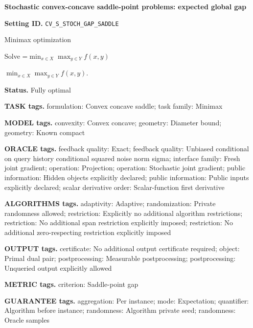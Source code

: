\documentclass[10pt,a4paper]{article}
\newcommand{\AtlasMath}[1]{\par\begingroup\centering\setbox0=\hbox{$\displaystyle #1$}\ifdim\wd0>1.4\linewidth\typeout{ATLAS WIDE FORMULA: \the\wd0}\fi\ifdim\wd0>\linewidth\resizebox{\linewidth}{!}{\box0}\else\box0\fi\par\endgroup}
\newcommand{\AtlasInlineMath}[1]{\begingroup\setbox0=\hbox{$#1$}\ifdim\wd0>.4\linewidth\endgroup\AtlasMath{#1}\else\endgroup$#1$\fi}
\begin{document}
\raggedright

{\LARGE\bfseries\sffamily\color{AtlasNavy} Stochastic convex-concave saddle-point problems: expected global gap\par}\vspace{5pt}


\textbf{Setting ID.} \texttt{CV\_\allowbreak{}S\_\allowbreak{}STOCH\_\allowbreak{}GAP\_\allowbreak{}SADDLE}



Minimax optimization



Solve \AtlasInlineMath{\min_{x\in X}\max_{y\in Y}f(x,y)}.



\textbf{Status.} Fully optimal



\textbf{TASK tags.} formulation: Convex concave saddle; task family: Minimax



\textbf{MODEL tags.} convexity: Convex concave; geometry: Diameter bound; geometry: Known compact



\textbf{ORACLE tags.} feedback quality: Exact; feedback quality: Unbiased conditional on query history conditional squared noise norm sigma; interface family: Fresh joint gradient; operation: Projection; operation: Stochastic joint gradient; public information: Hidden objects explicitly declared; public information: Public inputs explicitly declared; scalar derivative order: Scalar-function first derivative



\textbf{ALGORITHMS tags.} adaptivity: Adaptive; randomization: Private randomness allowed; restriction: Explicitly no additional algorithm restrictions; restriction: No additional span restriction explicitly imposed; restriction: No additional zero-respecting restriction explicitly imposed



\textbf{OUTPUT tags.} certificate: No additional output certificate required; object: Primal dual pair; postprocessing: Measurable postprocessing; postprocessing: Unqueried output explicitly allowed



\textbf{METRIC tags.} criterion: Saddle-point gap



\textbf{GUARANTEE tags.} aggregation: Per instance; mode: Expectation; quantifier: Algorithm before instance; randomness: Algorithm private seed; randomness: Oracle samples
\end{document}

